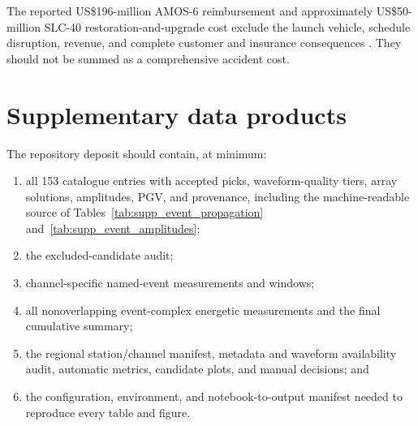 \documentclass[]{seismica}
\begin{document}
The reported US\$196-million AMOS-6 reimbursement and approximately
US\$50-million SLC-40 restoration-and-upgrade cost exclude the launch vehicle,
schedule disruption, revenue, and complete customer and insurance consequences
\citep{magan_amos6_2016,clark_slc40_2017}. They should not be summed as a
comprehensive accident cost.

\section{Supplementary data products}

The repository deposit should contain, at minimum:
\begin{enumerate}
  \item all 153 catalogue entries with accepted picks, waveform-quality tiers,
        array solutions, amplitudes, PGV, and provenance, including the
        machine-readable source of Tables~\ref{tab:supp_event_propagation}
        and~\ref{tab:supp_event_amplitudes};
  \item the excluded-candidate audit;
  \item channel-specific named-event measurements and windows;
  \item all nonoverlapping event-complex energetic measurements and the final
        cumulative summary;
  \item the regional station/channel manifest, metadata and waveform
        availability audit, automatic metrics, candidate plots, and manual
        decisions; and
  \item the configuration, environment, and notebook-to-output manifest needed
        to reproduce every table and figure.
\end{enumerate}


\end{document}
